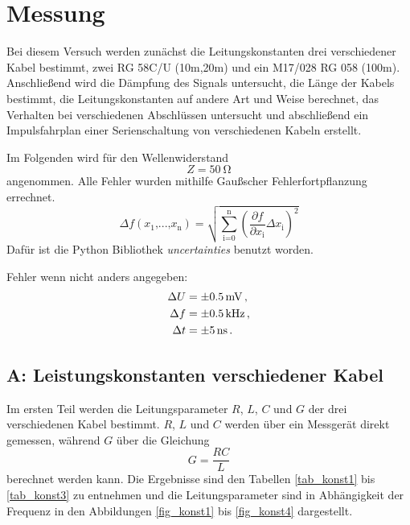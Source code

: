 \FloatBarrier
\section{Messung} %
\label{sec:section_name}

Bei diesem Versuch werden zunächst die Leitungskonstanten drei verschiedener Kabel bestimmt, zwei RG 58C/U (10m,20m) und ein M17/028 RG 058 (100m).
Anschließend wird die Dämpfung des Signals untersucht, die Länge der Kabels bestimmt, die Leitungskonstanten auf andere Art und Weise berechnet, das Verhalten bei verschiedenen Abschlüssen untersucht und abschließend ein Impulsfahrplan einer Serienschaltung von verschiedenen Kabeln erstellt.

Im Folgenden wird für den Wellenwiderstand
\begin{equation*}
	Z = \SI{50}{\ohm}
\end{equation*}
angenommen.
Alle Fehler wurden mithilfe Gaußscher Fehlerfortpflanzung errechnet.
\begin{equation*}
	\Delta f(x_\text{1}\text{,...,}x_\text{n}) = \sqrt{\sum_\text{i=0}^\text{n} \left(\frac{\partial f}{\partial x_\text{i}} \Delta x_\text{i}\right)^2}
\end{equation*}
Dafür ist die Python Bibliothek \textit{uncertainties} benutzt worden.

Fehler wenn nicht anders angegeben:
\begin{align*}
    \Delta U &= \SI{+-0.5}{mV}\,, \\
    \Delta f &= \SI{+-0.5}{kHz}\,,\\
	\Delta t &= \SI{+-5}{ns}\,.
\end{align*}

\subsection{A: Leistungskonstanten verschiedener Kabel} %
\label{sub:a_}


Im ersten Teil werden die Leitungsparameter $R$, $L$, $C$ und $G$ der drei verschiedenen Kabel bestimmt.
$R$, $L$ und $C$ werden über ein Messgerät direkt gemessen, während $G$ über die Gleichung
\begin{equation*}
	G = \frac{R C}{L}
\end{equation*}
berechnet werden kann.
Die Ergebnisse sind den Tabellen \ref{tab_konst1} bis \ref{tab_konst3} zu entnehmen und die Leitungsparameter sind in Abhängigkeit der Frequenz in den Abbildungen \ref{fig_konst1} bis \ref{fig_konst4} dargestellt.


